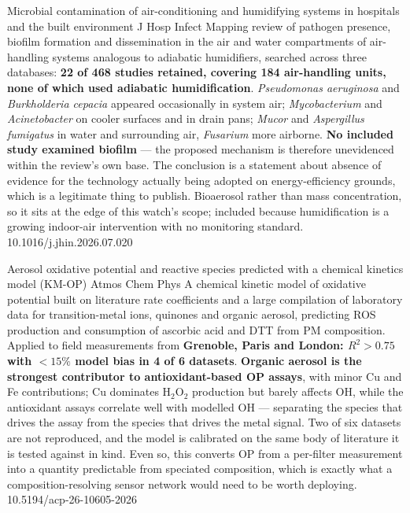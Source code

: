\documentclass[10pt]{article}
\begin{document}
{Microbial contamination of air-conditioning and humidifying systems in hospitals and the
built environment}
{J Hosp Infect}
{Mapping review of pathogen presence, biofilm formation and dissemination in the air and
water compartments of air-handling systems analogous to adiabatic humidifiers, searched
across three databases: \textbf{22 of 468 studies retained, covering 184 air-handling
units, none of which used adiabatic humidification}. \emph{Pseudomonas aeruginosa} and
\emph{Burkholderia cepacia} appeared occasionally in system air; \emph{Mycobacterium} and
\emph{Acinetobacter} on cooler surfaces and in drain pans; \emph{Mucor} and
\emph{Aspergillus fumigatus} in water and surrounding air, \emph{Fusarium} more airborne.
\textbf{No included study examined biofilm} --- the proposed mechanism is therefore
unevidenced within the review's own base. The conclusion is a statement about absence of
evidence for the technology actually being adopted on energy-efficiency grounds, which is
a legitimate thing to publish. Bioaerosol rather than mass concentration, so it sits at
the edge of this watch's scope; included because humidification is a growing indoor-air
intervention with no monitoring standard.}
{10.1016/j.jhin.2026.07.020}


{Aerosol oxidative potential and reactive species predicted with a chemical kinetics
model (KM-OP)}
{Atmos Chem Phys}
{A chemical kinetic model of oxidative potential built on literature rate coefficients and
a large compilation of laboratory data for transition-metal ions, quinones and organic
aerosol, predicting ROS production and consumption of ascorbic acid and DTT from PM
composition. Applied to field measurements from \textbf{Grenoble, Paris and London:
$R^2 > 0.75$ with $<15\%$ model bias in 4 of 6 datasets}. \textbf{Organic aerosol is the
strongest contributor to antioxidant-based OP assays}, with minor Cu and Fe
contributions; Cu dominates H$_2$O$_2$ production but barely affects \textbullet OH,
while the antioxidant assays correlate well with modelled \textbullet OH --- separating
the species that drives the assay from the species that drives the metal signal. Two of
six datasets are not reproduced, and the model is calibrated on the same body of
literature it is tested against in kind. Even so, this converts OP from a per-filter
measurement into a quantity predictable from speciated composition, which is exactly what
a composition-resolving sensor network would need to be worth deploying.}
{10.5194/acp-26-10605-2026}
\end{document}
